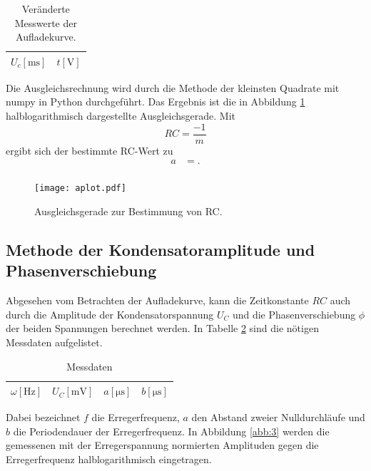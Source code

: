 \begin{table}[H]
  \centering
  \caption{Veränderte Messwerte der Aufladekurve.}
  \label{tab:werte_a_neu}
  \begin{tabular}{c c}
    \toprule
    {$U_c [\si{\milli\second}]$} & {$t [\si{\volt}]$}\\
    \midrule
    
    \bottomrule
  \end{tabular}
\end{table}

Die Ausgleichsrechnung wird durch die Methode der kleinsten Quadrate mit numpy in Python durchgeführt.
Das Ergebnis ist die in Abbildung \ref{fig:plot_a} halblogarithmisch dargestellte Ausgleichsgerade.
Mit
\begin{equation}
  RC = \frac{-1}{m}
\end{equation}
ergibt sich der bestimmte RC-Wert zu
\begin{align}
  a &= . \\
\end{align}
\begin{figure}[H]
  \centering
  \texttt{[image: aplot.pdf]}
  \caption{Ausgleichsgerade zur Bestimmung von RC.}
  \label{fig:plot_a}
\end{figure}

\subsection{Methode der Kondensatoramplitude und Phasenverschiebung}
Abgesehen vom Betrachten der Aufladekurve, kann die Zeitkonstante $RC$ auch durch die Amplitude der Kondensatorspannung $U_C$ und die Phasenverschiebung $\phi$ der beiden Spannungen berechnet werden.
In Tabelle \ref{tab:2} sind die nötigen Messdaten aufgelistet.

\begin{table}
  \centering
  \caption{Messdaten}
  \label{tab:2}
  \begin{tabular}{c c c c}
    \toprule
    {$\omega [\si{\hertz}]$} & {$U_C [\si{\milli\volt}]$} & {$a [\si{\micro\second}]$} & {$b [\si{\micro\second}]$}\\
    \midrule
    
    \bottomrule
  \end{tabular}
\end{table}

Dabei bezeichnet $f$ die Erregerfrequenz, $a$ den Abstand zweier Nulldurchläufe und $b$ die Periodendauer der Erregerfrequenz.
In Abbildung \ref{abb:3} werden die gemessenen mit der Erregerspannung normierten Amplituden gegen die Erregerfrequenz halblogarithmisch eingetragen.

